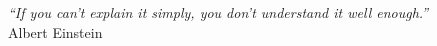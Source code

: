 
\cleardoublepage
\thispagestyle{plain}

\vspace*{8cm}

\begin{flushright}
   \textsl{``If you can't explain it simply, you don't understand it well enough.''}\\
\vspace*{1.5cm}
           Albert Einstein
\end{flushright}
